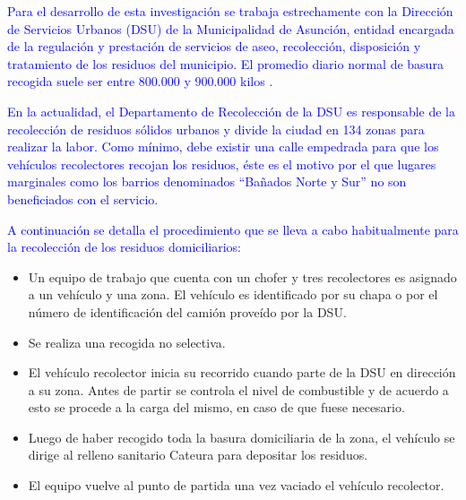 \documentclass[spanish, conference]{IEEEtran}
\begin{document}
{\textcolor{blue}{Para el desarrollo de esta investigación se trabaja estrechamente con la Dirección de Servicios Urbanos (DSU) de la Municipalidad de Asunción, entidad encargada de la regulación y prestación de servicios de aseo, recolección, disposición y tratamiento de los residuos del municipio. El promedio diario normal de basura recogida suele ser entre 800.000 y 900.000 kilos \cite{LaNacion2016AsuncionBasura}.}


\textcolor{blue}{En la actualidad, el Departamento de Recolección de la DSU es responsable de la recolección de residuos sólidos urbanos y divide la ciudad en 134 zonas para realizar la labor. Como mínimo, debe existir una calle empedrada para que los vehículos recolectores recojan los residuos, éste es el motivo por el que lugares marginales como los barrios denominados ``Bañados Norte y Sur'' no son beneficiados con el servicio.}

\textcolor{blue}{A continuación se detalla el procedimiento que se lleva a cabo habitualmente para la recolección de los residuos domiciliarios:}

\begin{itemize}
\item Un equipo de trabajo que cuenta con un chofer y tres recolectores es asignado a un vehículo y una zona. El vehículo es identificado por su chapa o por el número de identificación del camión proveído por la DSU.
\item Se realiza una recogida no selectiva.
\item El vehículo recolector inicia su recorrido cuando parte de la DSU en dirección a su zona. Antes de partir se controla el nivel de combustible y de acuerdo a esto se procede a la carga del mismo, en caso de que fuese necesario.
\item Luego de haber recogido toda la basura domiciliaria de la zona, el vehículo se dirige al relleno sanitario Cateura para depositar los residuos.
\item El equipo vuelve al punto de partida una vez vaciado el vehículo recolector.  
\end{itemize}

}
\end{document}

